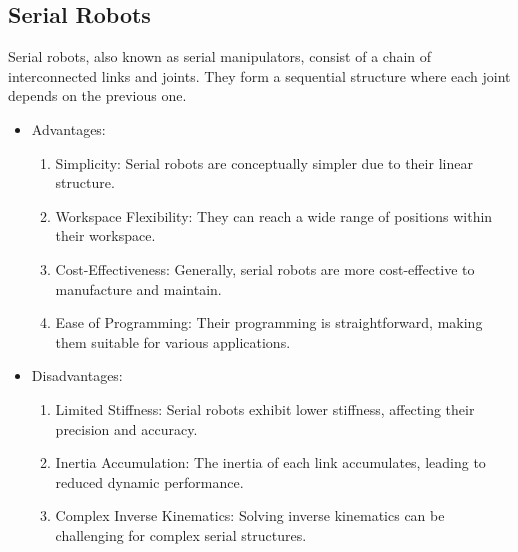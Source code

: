\documentclass[conference]{IEEEtran}
\begin{document}
\subsection{Serial Robots}
Serial robots, also known as serial manipulators, consist of a chain of interconnected links and joints. They form a sequential structure where each joint depends on the previous one.
\begin{itemize}
    \item Advantages:
    \begin{enumerate}
        \item Simplicity: Serial robots are conceptually simpler due to their linear structure.
        \item Workspace Flexibility: They can reach a wide range of positions within their workspace.
        \item Cost-Effectiveness: Generally, serial robots are more cost-effective to manufacture and maintain.
        \item Ease of Programming: Their programming is straightforward, making them suitable for various applications.
    \end{enumerate}
    \item Disadvantages:
    \begin{enumerate}
        \item Limited Stiffness: Serial robots exhibit lower stiffness, affecting their precision and accuracy.
        \item Inertia Accumulation: The inertia of each link accumulates, leading to reduced dynamic performance.
        \item Complex Inverse Kinematics: Solving inverse kinematics can be challenging for complex serial structures.
    \end{enumerate}
\end{itemize}
\end{document}
